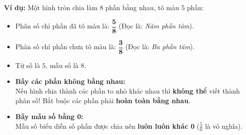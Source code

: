 \documentclass[14pt,a4paper,oneside]{extbook}
\begin{document}
\vspace{-2.5mm}
\noindent
\begin{minipage}[t]{0.49\textwidth}\vspace{0pt}
\begin{tcolorbox}[
  enhanced,
  colback=green!4!white,
  colframe=green!60!black,
  arc=2mm, boxrule=0.8pt,
  left=2mm, right=2mm, top=1.8mm, bottom=1.8mm,
  title={\footnotesize\bfseries\color{white}\faCheckCircle\ Ví dụ thực hành chuẩn mực}
]
{\footnotesize
\textbf{Ví dụ:} Một hình tròn chia làm 8 phần bằng nhau, tô màu 5 phần:
\begin{itemize}\setlength{\itemsep}{1pt}\setlength{\leftskip}{-2.5mm}
  \item Phân số chỉ phần đã tô màu là: $\mathbf{\dfrac{5}{8}}$ (Đọc là: \textit{Năm phần tám}).
  \item Phân số chỉ phần chưa tô màu là: $\mathbf{\dfrac{3}{8}}$ (Đọc là: \textit{Ba phần tám}).
  \item Tử số là $5$, mẫu số là $8$.
\end{itemize}
}
\end{tcolorbox}
\end{minipage}
\hfill
\begin{minipage}[t]{0.49\textwidth}\vspace{0pt}
\begin{tcolorbox}[
  enhanced,
  colback=red!4!white,
  colframe=red!70!black,
  arc=2mm, boxrule=0.8pt,
  left=2mm, right=2mm, top=1.8mm, bottom=1.8mm,
  title={\footnotesize\bfseries\color{white}\faExclamationTriangle\ Mẹo tránh bẫy trắc nghiệm}
]
{\footnotesize
\begin{itemize}\setlength{\itemsep}{1.5pt}\setlength{\leftskip}{-2.5mm}
  \item \textbf{Bẫy các phần không bằng nhau:}\\
  Nếu hình chia thành các phần to nhỏ khác nhau thì \textbf{không thể} viết thành phân số! Bắt buộc các phần phải \textbf{hoàn toàn bằng nhau}.
  \item \textbf{Bẫy mẫu số bằng 0:}\\
  Mẫu số biểu diễn số phần được chia nên \textbf{luôn luôn khác 0} ($\frac{5}{0}$ là vô nghĩa).
\end{itemize}
}
\end{tcolorbox}
\end{minipage}
\end{document}
